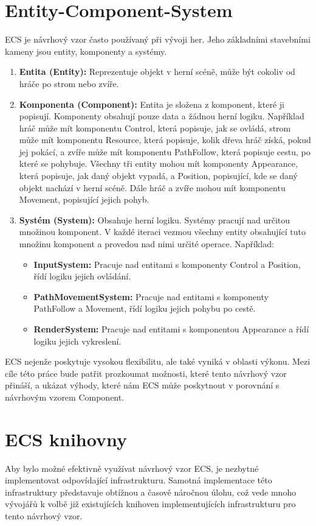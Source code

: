 \section{Entity-Component-System}
ECS je návrhový vzor často používaný při vývoji her. Jeho základními stavebními kameny jsou entity, komponenty a systémy.
\begin{enumerate}
    \item \textbf{Entita (Entity):} Reprezentuje objekt v herní scéně, může být cokoliv od hráče po strom nebo zvíře.
    \item \textbf{Komponenta (Component):} Entita je složena z komponent, které ji popisují. Komponenty obsahují pouze data a žádnou herní logiku. Například hráč může mít komponentu Control, která popisuje, jak se ovládá, strom může mít komponentu Resource, která popisuje, kolik dřeva hráč získá, pokud jej pokácí, a zvíře může mít komponentu PathFollow, která popisuje cestu, po které se pohybuje. Všechny tři entity mohou mít komponenty Appearance, která popisuje, jak daný objekt vypadá, a Position, popisující, kde se daný objekt nachází v herní scéně. Dále hráč a zvíře mohou mít komponentu Movement, popisující jejich pohyb.
    \item \textbf{Systém (System):} Obsahuje herní logiku. Systémy pracují nad určitou množinou komponent. V každé iteraci vezmou všechny entity obsahující tuto množinu komponent a provedou nad nimi určité operace. Například:
    \begin{itemize}
        \item \textbf{InputSystem:} Pracuje nad entitami s komponenty Control a Position, řídí logiku jejich ovládání.
        \item \textbf{PathMovementSystem:} Pracuje nad entitami s komponenty PathFollow a Movement, řídí logiku jejich pohybu po cestě.
        \item \textbf{RenderSystem:} Pracuje nad entitami s komponentou Appearance a řídí logiku jejich vykreslení.
    \end{itemize}
\end{enumerate}
ECS nejenže poskytuje vysokou flexibilitu, ale také vyniká v oblasti výkonu. Mezi cíle této práce bude patřit prozkoumat možnosti, které tento návrhový vzor přináší, a ukázat výhody, které nám ECS může poskytnout v porovnání s návrhovým vzorem Component.

\section{ECS knihovny}
Aby bylo možné efektivně využívat návrhový vzor ECS, je nezbytné implementovat odpovídající infrastrukturu. Samotná implementace této infrastruktury představuje obtížnou a časově náročnou úlohu, což vede mnoho vývojářů k volbě již existujících knihoven implementujících infrastrukturu pro tento návrhový vzor.

